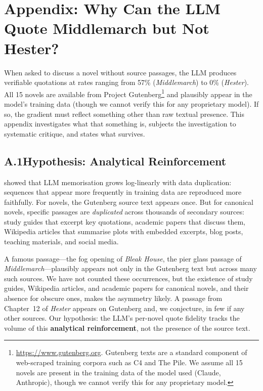 
\section*{Appendix: Why Can the LLM Quote Middlemarch but Not Hester?}
\label{app:reinforcement}

\noindent
When asked to discuss a novel without source passages, the LLM produces
verifiable quotations at rates ranging from 57\%
(\emph{Middlemarch}) to 0\% (\emph{Hester}).  All 15 novels are
available from Project Gutenberg\footnote{%
  \url{https://www.gutenberg.org}.  Gutenberg texts are a standard
  component of web-scraped training corpora such as C4
  and The Pile.  We assume all 15 novels are present in the training
  data of the model used (Claude, Anthropic), though we cannot verify
  this for any proprietary model.}
and plausibly appear in the model's training data (though we cannot
verify this for any proprietary model).  If so, the gradient
must reflect something other than raw textual presence.  This
appendix investigates what that something is, subjects the
investigation to systematic critique, and states what survives.

\subsection*{A.1\quad Hypothesis: Analytical Reinforcement}

\textcite{carlini2023quantifying} showed that LLM memorisation grows
log-linearly with data duplication: sequences that appear more
frequently in training data are reproduced more faithfully.  For
novels, the Gutenberg source text appears once.  But for canonical
novels, specific passages are \emph{duplicated} across thousands of
secondary sources: study guides that excerpt key quotations, academic
papers that discuss them, Wikipedia articles that summarise plots with
embedded excerpts, blog posts, teaching materials, and social media.

A famous passage---the fog opening of \emph{Bleak House}, the pier
glass passage of \emph{Middlemarch}---plausibly appears not only in the
Gutenberg text but across many such sources.  We have not counted these
occurrences, but the existence of study guides, Wikipedia articles, and
academic papers for canonical novels, and their absence for obscure
ones, makes the asymmetry likely.  A passage from
Chapter~12 of \emph{Hester} appears on Gutenberg and, we conjecture,
in few if any other sources.  Our hypothesis: the LLM's per-novel quote fidelity
tracks the volume of this \textbf{analytical reinforcement}, not the
presence of the source text.

